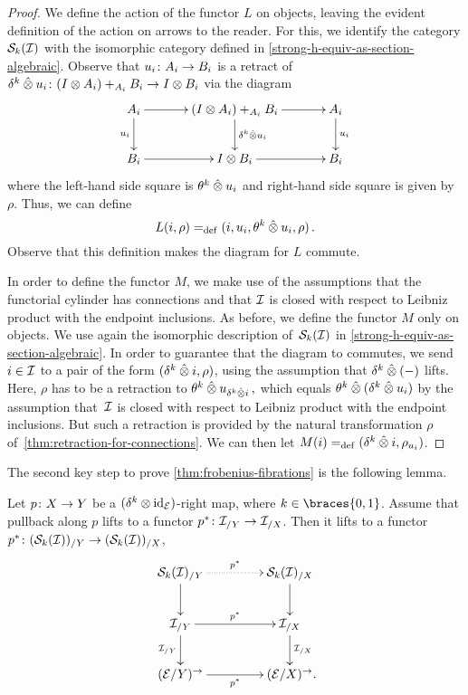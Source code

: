 \documentclass[reqno,10pt,a4paper,oneside,draft]{amsart}
\begin{document}
\begin{proof}
We define the action of the functor $L$ on objects, leaving the evident definition of the action on arrows to the reader.
For this, we identify the category $\cal{S}_k(\cal{I})$ with the isomorphic category defined in \cref{strong-h-equiv-as-section-algebraic}.
Observe that $u_i \co A_i \to B_i$ is a retract of~$\kcyl \hatotimes u_i \co (\interval \otimes A_i) +_{A_i} B_i \to \interval \otimes B_i$ via the diagram
\[
\xymatrix@C+1em{
  A_i \ar[d]_{u_i} \ar[r] & (\interval \otimes A_i) +_{A_i} B_i \ar[r] \ar[d]^{\kcyl \hatotimes u_i } & A_i \ar[d]^{u_i} \\
  B_i \ar[r] & \interval \otimes B_i \ar[r] & B_i }
\]
where the left-hand side square is $\thetak \hatotimes u_i$ and right-hand side square is given by $\rho$.
Thus, we can define
\[
  L(i, \rho) \defeq (i, u_i, \thetak \hatotimes u_i, \rho)
\, .\]
Observe that this definition makes the diagram for $L$ commute.

\medskip

In order to define the functor $M$, we make use of the assumptions that the functorial cylinder has connections and that $\cal{I}$ is closed with respect to Leibniz product with the endpoint inclusions.
As before, we define the functor $M$ only on objects.
We use again the isomorphic description of~$\cal{S}_k(\cal{I})$ in \cref{strong-h-equiv-as-section-algebraic}.
In order to guarantee that the diagram to commutes, we send $i \in \cal{I}$ to a pair of the form $(\kcyl \hatotimes i, \rho)$, using the assumption that $\kcyl \hatotimes (-)$ lifts.
Here, $\rho$ has to be a retraction to $\thetak \hatotimes u_{\kcyl \hatotimes i}\, ,$ which equals $\thetak \hatotimes (\kcyl \hatotimes u_i)$ by the assumption that~$\cal{I}$ is closed with respect to Leibniz product with the endpoint inclusions.
But such a retraction is provided by the natural transformation $\rho$ of~\cref{thm:retraction-for-connections}.
We can then let $M(i) \defeq (\kcyl \hatotimes i, \rho_{u_i})$.
\end{proof}

The second key step to prove \cref{thm:frobenius-fibrations} is the following lemma.


\begin{lemma} \label{strong-h-equiv-base-change-along-fibration}
Let $p \co X \to Y$ be a $(\kcyl \otimes \id_{\calE})$-right map, where $k \in \braces{0, 1}$.
Assume that pullback along $p$ lifts to a functor $p^* \co \cal{I}_{/Y} \to \cal{I}_{/X}$.
Then it lifts to a functor $p^* \co (\cal{S}_k(\cal{I}))_{/Y} \to (\cal{S}_k(\cal{I}))_{/X}$, 
\[
\xymatrix@C+2em{
  \cal{S}_k(\cal{I})_{/Y}
  \ar@{.>}[r]^{p^*}
  \ar[d]
&
  \cal{S}_k(\cal{I})_{/X}
  \ar[d]
\\
  \cal{I}_{/Y}
  \ar[r]^{p^*}
  \ar[d]_{\cal{I}_{/Y}}
&
  \cal{I}_{/X}
  \ar[d]^{\cal{I}_{/X}}
\\
  (\catE / Y)^\to
  \ar[r]_{p^*}
&
  (\catE / X)^\to \rlap{.}
}
\]
\end{lemma}
\end{document}
